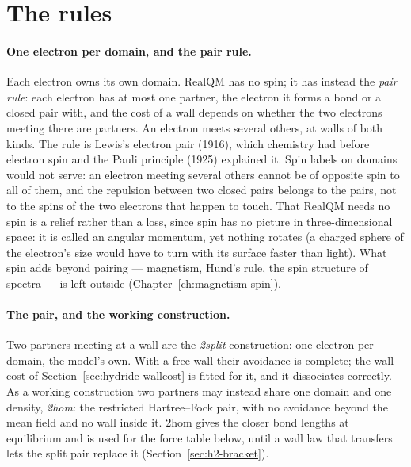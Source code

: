\section{The rules}\label{sec:hydride-rules}

\paragraph{One electron per domain, and the pair rule.} Each electron owns its own domain. RealQM has no
spin; it has instead the \emph{pair rule}: each electron has at most one partner, the electron it forms a bond
or a closed pair with, and the cost of a wall depends on whether the two electrons meeting there are partners.
An electron meets several others, at walls of both kinds. The rule is Lewis's electron pair (1916), which
chemistry had before electron spin and the Pauli principle (1925) explained it. Spin labels on domains would
not serve: an electron meeting several others cannot be of opposite spin to all of them, and the repulsion
between two closed pairs belongs to the pairs, not to the spins of the two electrons that happen to touch. That
RealQM needs no spin is a relief rather than a loss, since spin has no picture in three-dimensional space: it
is called an angular momentum, yet nothing rotates (a charged sphere of the electron's size would have to
turn with its surface faster than light). What spin adds beyond pairing --- magnetism, Hund's rule, the spin
structure of spectra --- is left outside (Chapter~\ref{ch:magnetism-spin}).

\paragraph{The pair, and the working construction.} Two partners meeting at a wall are the \emph{2split}
construction: one electron per domain, the model's own. With a free wall their avoidance is complete; the
wall cost of Section~\ref{sec:hydride-wallcost} is fitted for it, and it dissociates correctly. As a working
construction two partners may instead share one domain and one density, \emph{2hom}: the restricted
Hartree--Fock pair, with no avoidance beyond the mean field and no wall inside it. 2hom gives the closer bond
lengths at equilibrium and is used for the force table below, until a wall law that transfers lets the split
pair replace it (Section~\ref{sec:h2-bracket}).

